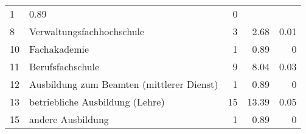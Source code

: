 \begin{longtable}{lXrrr}
       \num{1} &
       \num[round-mode=places,round-precision=2]{0,89} &
         \num[round-mode=places,round-precision=2]{0} \\

     8 &
     \multicolumn{1}{X}{ Verwaltungsfachhochschule   } &


       \num{3} &
       \num[round-mode=places,round-precision=2]{2,68} &
         \num[round-mode=places,round-precision=2]{0,01} \\

     10 &
     \multicolumn{1}{X}{ Fachakademie   } &


       \num{1} &
       \num[round-mode=places,round-precision=2]{0,89} &
         \num[round-mode=places,round-precision=2]{0} \\

     11 &
     \multicolumn{1}{X}{ Berufsfachschule   } &


       \num{9} &
       \num[round-mode=places,round-precision=2]{8,04} &
         \num[round-mode=places,round-precision=2]{0,03} \\

     12 &
     \multicolumn{1}{X}{ Ausbildung zum Beamten (mittlerer Dienst)   } &


       \num{1} &
       \num[round-mode=places,round-precision=2]{0,89} &
         \num[round-mode=places,round-precision=2]{0} \\

     13 &
     \multicolumn{1}{X}{ betriebliche Ausbildung (Lehre)   } &


       \num{15} &
       \num[round-mode=places,round-precision=2]{13,39} &
         \num[round-mode=places,round-precision=2]{0,05} \\

     15 &
     \multicolumn{1}{X}{ andere Ausbildung   } &


       \num{1} &
       \num[round-mode=places,round-precision=2]{0,89} &
         \num[round-mode=places,round-precision=2]{0} \\


\end{longtable}

